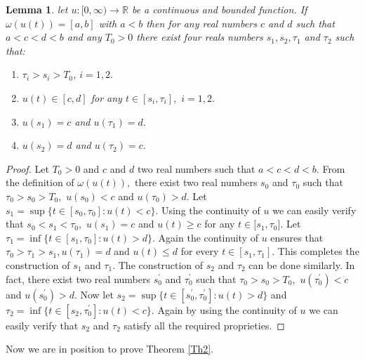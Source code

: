 \documentclass[11pt]{amsart}%
\theoremstyle{plain}
\numberwithin{equation}{section}
\newtheorem{lemma}{Lemma}[section]
\begin{document}
\begin{lemma}
\label{l3}
let $u:[0,\infty )\to \mathbb{R}$ be a continuous and bounded
function. If $\omega (u(t))=[a,b]$ with $a<b$ then for any real numbers $c$
and $d$ such that $a<c<d<b$ and any $T_{0}>0$ there exist four reals numbers
$s_{1},s_{2},\tau _{1}$ and $\tau _{2}$ such that:
\begin{enumerate}
\item $\tau _{i}>s_{i}>T_{0}$, $i=1,2.$
\item $u(t)\in [c,d]$ for any $t\in [s_{i},\tau _{i}],$ $%
i=1,2.$
\item $u(s_{1})=c$ and $u(\tau _{1})=d.$
\item $u(s_{2})=d$ and $u(\tau _{2})=c.$
\end{enumerate}
\end{lemma}
\begin{proof}
Let $T_{0}>0$ and $c$ and $d$ two real numbers such that $a<c<d<b.$ From the
definition of $\omega (u(t)),$ there exist two real numbers $s_{0}$ and $%
\tau _{0}$ such that $\tau _{0}>s_{0}>T_{0},$ $u(s_{0})<c$ and $u(\tau
_{0})>d.$ Let $s_{1}=\sup \{t\in [s_{0},\tau _{0}]:u(t)<c\}.$ Using
the continuity of $u$ we can easily verify that $s_{0}<s_{1}<\tau _{0},$ $%
u(s_{1})=c$ and $u(t)\geq c$ for any $t\in \lbrack s_{1},\tau _{0}]$. Let $%
\tau _{1}=\inf \{t\in [s_{1},\tau _{0}]:u(t)>d\}.$ Again the
continuity of $u$ ensures that $\tau _{0}>\tau _{1}>s_{1},u(\tau _{1})=d$
and $u(t)\leq d$ for every $t\in [s_{1},\tau _{1}].$ This completes
the construction of $s_{1}$ and $\tau _{1}.$ The construction of $s_{2}$ and
$\tau _{2}$ can be done similarly. In fact, there exist two real numbers $%
s_{0}^{\prime }$ and $\tau _{0}^{\prime }$ such that $\tau _{0}>s_{0}>T_{0},$
$u(\tau _{0}^{\prime })<c$ and $u(s_{0}^{\prime })>d.$ Now let $s_{2}=\sup
\{t\in [s_{0}^{\prime },\tau _{0}^{\prime }]:u(t)>d\}$ and $\tau
_{2}=\inf \{t\in [s_{2},\tau _{0}^{\prime }]:u(t)<c\}.$ Again by
using the continuity of $u$ we can easily verify that $s_{2}$ and $\tau _{2}$
satisfy all the required proprieties.
\end{proof}

Now we are in position to prove Theorem \ref{Th2}.
\end{document}

